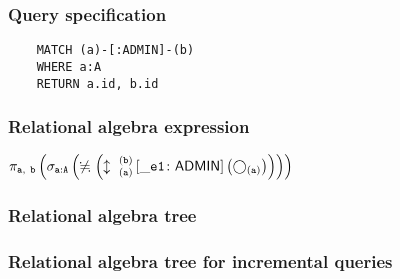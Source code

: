 	\subsubsection*{Query specification}

	\begin{lstlisting}
	MATCH (a)-[:ADMIN]-(b)
	WHERE a:A
	RETURN a.id, b.id
	\end{lstlisting}


	\subsubsection*{Relational algebra expression}

	$\projection{\var{a},~\var{b}} \left(\selection{\mathtt{a:A}} \left(\alldifferent{} \left(\expandboth{a}{b}{}{\_e1}{ADMIN} \left(\getvertices{a}{}\right)\right)\right)\right)$

	\subsubsection*{Relational algebra tree}


	\subsubsection*{Relational algebra tree for incremental queries}

